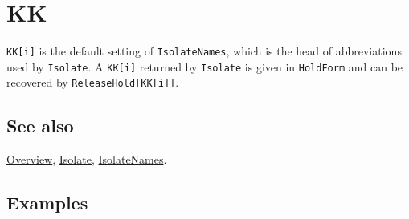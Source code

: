 \documentclass[../FeynCalcManual.tex]{subfiles}
\begin{document}
\hypertarget{kk}{%
\section{KK}\label{kk}}

\texttt{KK[\allowbreak{}i]} is the default setting of
\texttt{IsolateNames}, which is the head of abbreviations used by
\texttt{Isolate}. A \texttt{KK[\allowbreak{}i]} returned by
\texttt{Isolate} is given in \texttt{HoldForm} and can be recovered by
\texttt{ReleaseHold[\allowbreak{}KK[\allowbreak{}i]]}.

\subsection{See also}

\hyperlink{toc}{Overview}, \hyperlink{isolate}{Isolate},
\hyperlink{isolatenames}{IsolateNames}.

\subsection{Examples}
\end{document}
